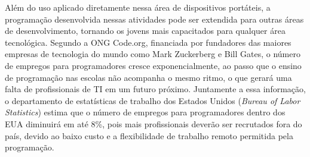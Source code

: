 Além do uso aplicado diretamente nessa área de dispositivos portáteis, a programação desenvolvida nessas atividades pode ser extendida para outras áreas de desenvolvimento, tornando os jovens mais capacitados para qualquer área tecnológica. Segundo a ONG Code.org, financiada por fundadores das maiores empresas de tecnologia do mundo como Mark Zuckerberg e Bill Gates, o número de empregos para programadores cresce exponencialmente, ao passo que o ensino de programação nas escolas não acompanha o mesmo ritmo, o que gerará uma falta de profissionais de TI em um futuro próximo. Juntamente a essa informação, o departamento de estatísticas de trabalho dos Estados Unidos (\textit{Bureau of Labor Statistics}) estima que o número de empregos para programadores dentro dos EUA diminuirá em até 8\%, pois mais profissionais deverão ser recrutados fora do país, devido ao baixo custo e a flexibilidade de trabalho remoto permitida pela programação. \cite{bls}